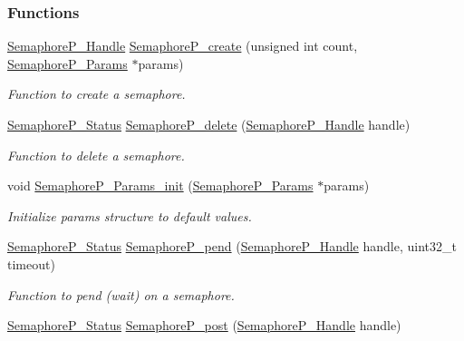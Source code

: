 \subsubsection*{Functions}
\begin{DoxyCompactItemize}
\item 
\hyperlink{_semaphore_p_8h_a7f34865f33e666455692544e5f12d1f2}{Semaphore\+P\+\_\+\+Handle} \hyperlink{_semaphore_p_8h_a3fd837348befa046554496e8da2a1fac}{Semaphore\+P\+\_\+create} (unsigned int count, \hyperlink{struct_semaphore_p___params}{Semaphore\+P\+\_\+\+Params} $\ast$params)
\begin{DoxyCompactList}\small\item\em Function to create a semaphore. \end{DoxyCompactList}\item 
\hyperlink{_semaphore_p_8h_a5d4aebe0ebff4aaadba07d853ae4ee42}{Semaphore\+P\+\_\+\+Status} \hyperlink{_semaphore_p_8h_aa3c18c0d9bc7d13ac5d28dcfec842b81}{Semaphore\+P\+\_\+delete} (\hyperlink{_semaphore_p_8h_a7f34865f33e666455692544e5f12d1f2}{Semaphore\+P\+\_\+\+Handle} handle)
\begin{DoxyCompactList}\small\item\em Function to delete a semaphore. \end{DoxyCompactList}\item 
void \hyperlink{_semaphore_p_8h_a5a2deea3033e8a6aa2564637958efd02}{Semaphore\+P\+\_\+\+Params\+\_\+init} (\hyperlink{struct_semaphore_p___params}{Semaphore\+P\+\_\+\+Params} $\ast$params)
\begin{DoxyCompactList}\small\item\em Initialize params structure to default values. \end{DoxyCompactList}\item 
\hyperlink{_semaphore_p_8h_a5d4aebe0ebff4aaadba07d853ae4ee42}{Semaphore\+P\+\_\+\+Status} \hyperlink{_semaphore_p_8h_a375d7e0596970995eaa2c2bc77d7acb3}{Semaphore\+P\+\_\+pend} (\hyperlink{_semaphore_p_8h_a7f34865f33e666455692544e5f12d1f2}{Semaphore\+P\+\_\+\+Handle} handle, uint32\+\_\+t timeout)
\begin{DoxyCompactList}\small\item\em Function to pend (wait) on a semaphore. \end{DoxyCompactList}\item 
\hyperlink{_semaphore_p_8h_a5d4aebe0ebff4aaadba07d853ae4ee42}{Semaphore\+P\+\_\+\+Status} \hyperlink{_semaphore_p_8h_aae0a3a615ec693fc13da14ebaec9df9b}{Semaphore\+P\+\_\+post} (\hyperlink{_semaphore_p_8h_a7f34865f33e666455692544e5f12d1f2}{Semaphore\+P\+\_\+\+Handle} handle)

\end{DoxyCompactItemize}
